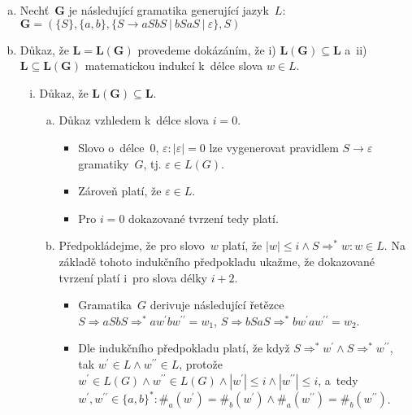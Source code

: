 \documentclass[a4paper, 11pt]{scrartcl}
\begin{document}
	\begin{enumerate}[(a)]
		\item
			Nechť~$ \boldsymbol{G} $ je následující gramatika generující
			jazyk~$ L $: \\
			$ \boldsymbol{G} = (\{S\}, \{a, b\}, \{S \rightarrow aSbS\ |\
			bSaS\ |\ \varepsilon\}, S) $

		\item
			Důkaz, že $ \boldsymbol{L = L(G)} $ provedeme dokázáním, že i)
			$ \boldsymbol{L(G) \subseteq L} $ a~ii) $ \boldsymbol{L \subseteq
			L(G)} $ matematickou indukcí k~délce slova $ w \in L $.

			\begin{enumerate}[i)]
				\item
					Důkaz, že $ \boldsymbol{L(G) \subseteq L} $.

					\begin{enumerate}[a)]
						\item
							Důkaz vzhledem k~délce slova $ i = 0 $.

							\begin{itemize}[label=$ \bullet $]
								\item
									Slovo o~délce~$ 0 $, $ \varepsilon:
									|\varepsilon| = 0 $ lze vygenerovat
									pravidlem $ S \rightarrow \varepsilon $
									gramatiky~$ G $, tj. $ \varepsilon \in
									L(G) $.

								\item
									Zároveň platí, že $ \varepsilon \in L $.

								\item
									Pro $ i = 0 $ dokazované tvrzení tedy platí.
							\end{itemize}

						\item
							Předpokládejme, že pro slovo~$ w $ platí, že
							$ |w| \leq i \wedge S \Rightarrow^* w : w \in L $.
							Na základě tohoto indukčního předpokladu ukažme,
							že dokazované tvrzení platí i~pro slova délky
							$ i + 2 $.

							\begin{itemize}[label=$ \bullet $]
								\item
									Gramatika~$ G $ derivuje následující
									řetězce $ S \Rightarrow aSbS
									\Rightarrow^* aw^{\prime}bw^{\prime
									\prime} = w_1 $, $ S \Rightarrow bSaS
									\Rightarrow^* bw^{\prime}aw^{\prime
									\prime} = w_2 $.

								\item
									Dle indukčního předpokladu platí, že když
									$ S \Rightarrow^* w^\prime \wedge S
									\Rightarrow^* w^{\prime\prime} $, tak
									$ w^\prime \in L \wedge w^{\prime\prime}
									\in L $, protože $ w^\prime \in L(G)
									\wedge w^{\prime\prime} \in L(G) \wedge
									|w^\prime| \leq i \wedge |w^{\prime
									\prime}| \leq i $, a~tedy $ w^\prime,
									w^{\prime\prime} \in \{a, b\}^*:
									\#_a(w^\prime) = \#_b(w^\prime)
									\wedge \#_a(w^{\prime\prime}) = \#_b(w^{
									\prime\prime}) $.


\end{itemize}
\end{enumerate}
\end{enumerate}
\end{enumerate}
\end{document}

